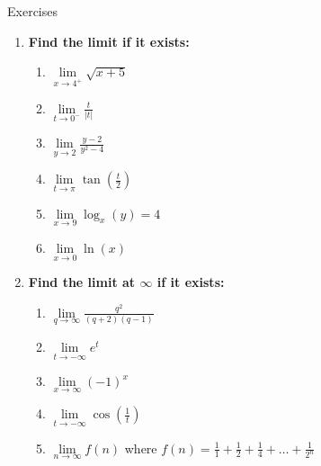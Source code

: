 \documentclass[../revisedMain.tex]{subfiles}
\begin{document}
\begin{center}
	{\Large Exercises}
\end{center}
\begin{enumerate}
	\item \textbf{Find the limit if it exists:}
	\begin{enumerate}
		\item $\lim\limits_{x\to 4^+}\displaystyle\sqrt{x+5}$
		\item $\lim\limits_{t\to 0^-}\displaystyle\frac{t}{\left| t \right|}$
		\item $\lim\limits_{y\to 2}\displaystyle\frac{y-2}{y^2-4}$
		\item $\lim\limits_{t\to \pi}\displaystyle\tan\left(\displaystyle\frac{t}{2}\right)$
		\item $\lim\limits_{x\to 9}\log_x(y)=4$
		\item $\lim\limits_{x\to 0}\ln(x)$
	\end{enumerate}
	\item \textbf{Find the limit at $\infty$ if it exists:}
	\begin{enumerate}
		\item $\lim\limits_{q\to\infty}\displaystyle\frac{q^2}{(q+2)(q-1)}$
		\item $\lim\limits_{t\to-\infty}e^t$
		\item $\lim\limits_{x\to\infty}(-1)^x$
		\item $\lim\limits_{t\to-\infty}\cos\left(\displaystyle\frac{1}{t}\right)$
		\item $\lim\limits_{n\to\infty}f(n)$ where $f(n)=\displaystyle\frac{1}{1}+\displaystyle\frac{1}{2}+\displaystyle\frac{1}{4}+\dots+\displaystyle\frac{1}{2^n}$
	\end{enumerate}
\end{enumerate}
\end{document}
